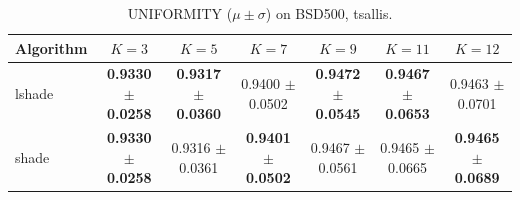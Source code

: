 \begin{table}[htbp]
\centering
\caption{UNIFORMITY ($\mu \pm \sigma$) on BSD500, tsallis.}
\label{tab:exp1-tsallis-uniformity}
\begin{tabular}{lcccccc}
\toprule
Algorithm & $K=3$ & $K=5$ & $K=7$ & $K=9$ & $K=11$ & $K=12$ \\
\midrule
lshade & \textbf{0.9330 $\pm$ 0.0258} & \textbf{0.9317 $\pm$ 0.0360} & 0.9400 $\pm$ 0.0502 & \textbf{0.9472 $\pm$ 0.0545} & \textbf{0.9467 $\pm$ 0.0653} & 0.9463 $\pm$ 0.0701 \\
shade & \textbf{0.9330 $\pm$ 0.0258} & 0.9316 $\pm$ 0.0361 & \textbf{0.9401 $\pm$ 0.0502} & 0.9467 $\pm$ 0.0561 & 0.9465 $\pm$ 0.0665 & \textbf{0.9465 $\pm$ 0.0689} \\
\bottomrule
\end{tabular}
\end{table}